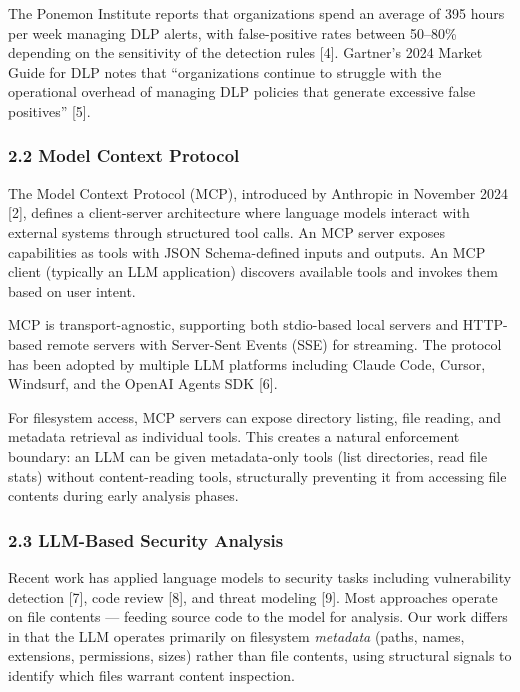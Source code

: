 \documentclass[
]{article}
\begin{document}
The Ponemon Institute reports that organizations spend an average of 395
hours per week managing DLP alerts, with false-positive rates between
50--80\% depending on the sensitivity of the detection rules {[}4{]}.
Gartner's 2024 Market Guide for DLP notes that ``organizations continue
to struggle with the operational overhead of managing DLP policies that
generate excessive false positives'' {[}5{]}.

\subsubsection{2.2 Model Context Protocol}\label{model-context-protocol}

The Model Context Protocol (MCP), introduced by Anthropic in November
2024 {[}2{]}, defines a client-server architecture where language models
interact with external systems through structured tool calls. An MCP
server exposes capabilities as tools with JSON Schema-defined inputs and
outputs. An MCP client (typically an LLM application) discovers
available tools and invokes them based on user intent.

MCP is transport-agnostic, supporting both stdio-based local servers and
HTTP-based remote servers with Server-Sent Events (SSE) for streaming.
The protocol has been adopted by multiple LLM platforms including Claude
Code, Cursor, Windsurf, and the OpenAI Agents SDK {[}6{]}.

For filesystem access, MCP servers can expose directory listing, file
reading, and metadata retrieval as individual tools. This creates a
natural enforcement boundary: an LLM can be given metadata-only tools
(list directories, read file stats) without content-reading tools,
structurally preventing it from accessing file contents during early
analysis phases.

\subsubsection{2.3 LLM-Based Security
Analysis}\label{llm-based-security-analysis}

Recent work has applied language models to security tasks including
vulnerability detection {[}7{]}, code review {[}8{]}, and threat
modeling {[}9{]}. Most approaches operate on file contents --- feeding
source code to the model for analysis. Our work differs in that the LLM
operates primarily on filesystem \emph{metadata} (paths, names,
extensions, permissions, sizes) rather than file contents, using
structural signals to identify which files warrant content inspection.
\end{document}
